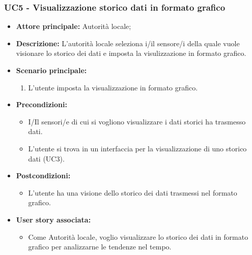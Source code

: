 \subsubsection{UC5 - Visualizzazione storico dati in formato grafico}
\begin{itemize}
    \item \textbf{Attore principale:} Autorità locale;
    \item \textbf{Descrizione:} L’autorità locale seleziona i/il sensore/i della quale vuole visionare lo storico dei dati e imposta la visulizzazione in formato grafico.
    \item \textbf{Scenario principale:}
          \begin{enumerate}
              \item L'utente imposta la visualizzazione in formato grafico.
          \end{enumerate}
    \item \textbf{Precondizioni:}
          \begin{itemize}
              \item  I/Il sensori/e di cui si vogliono visualizzare i dati storici ha trasmesso dati.
              \item  L'utente si trova in un interfaccia per la visualizzazione di uno storico dati (UC3).
          \end{itemize}
    \item \textbf{Postcondizioni:}
          \begin{itemize}
              \item  L'utente ha una visione dello storico dei dati trasmessi nel formato grafico.
          \end{itemize}
    \item \textbf{User story associata:}
          \begin{itemize}
              \item Come Autorità locale, voglio visualizzare lo storico dei dati in formato grafico per analizzarne le tendenze nel tempo.
          \end{itemize}
\end{itemize}